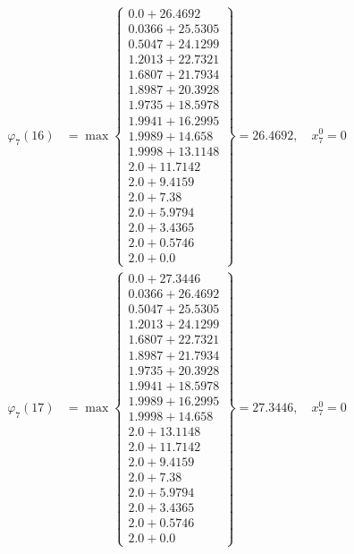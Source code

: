 \documentclass{article}
\begin{document}
\begin{align*}
\varphi_{7}(16) &= \max \left\{ \begin{array}{c}
0.0 + 26.4692 \\
 0.0366 + 25.5305 \\
 0.5047 + 24.1299 \\
 1.2013 + 22.7321 \\
 1.6807 + 21.7934 \\
 1.8987 + 20.3928 \\
 1.9735 + 18.5978 \\
 1.9941 + 16.2995 \\
 1.9989 + 14.658 \\
 1.9998 + 13.1148 \\
 2.0 + 11.7142 \\
 2.0 + 9.4159 \\
 2.0 + 7.38 \\
 2.0 + 5.9794 \\
 2.0 + 3.4365 \\
 2.0 + 0.5746 \\
 2.0 + 0.0
\end{array} \right\}=26.4692, \quad x_{7}^0=0\\
  
\varphi_{7}(17) &= \max \left\{ \begin{array}{c}
0.0 + 27.3446 \\
 0.0366 + 26.4692 \\
 0.5047 + 25.5305 \\
 1.2013 + 24.1299 \\
 1.6807 + 22.7321 \\
 1.8987 + 21.7934 \\
 1.9735 + 20.3928 \\
 1.9941 + 18.5978 \\
 1.9989 + 16.2995 \\
 1.9998 + 14.658 \\
 2.0 + 13.1148 \\
 2.0 + 11.7142 \\
 2.0 + 9.4159 \\
 2.0 + 7.38 \\
 2.0 + 5.9794 \\
 2.0 + 3.4365 \\
 2.0 + 0.5746 \\
 2.0 + 0.0
\end{array} \right\}=27.3446, \quad x_{7}^0=0\\
  

\end{align*}
\end{document}
